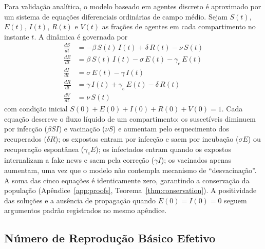 \documentclass[12pt,a4paper]{article}
\theoremstyle{definition}
\theoremstyle{plain}
\begin{document}
Para validação analítica, o modelo baseado em agentes discreto é aproximado por um sistema de equações diferenciais ordinárias de campo médio. Sejam $S(t)$, $E(t)$, $I(t)$, $R(t)$ e $V(t)$ as frações de agentes em cada compartimento no instante $t$. A dinâmica é governada por
\begin{align}
\frac{dS}{dt} &= -\beta\, S(t)\, I(t) + \delta\, R(t) - \nu\, S(t) \label{eq:dS}\\
\frac{dE}{dt} &= \beta\, S(t)\, I(t) - \sigma\, E(t) - \gamma_e\, E(t) \label{eq:dE}\\
\frac{dI}{dt} &= \sigma\, E(t) - \gamma\, I(t) \label{eq:dI}\\
\frac{dR}{dt} &= \gamma\, I(t) + \gamma_e\, E(t) - \delta\, R(t) \label{eq:dR}\\
\frac{dV}{dt} &= \nu\, S(t) \label{eq:dV}
\end{align}
com condição inicial $S(0) + E(0) + I(0) + R(0) + V(0) = 1$. Cada equação descreve o fluxo líquido de um compartimento: os suscetíveis diminuem por infecção ($\beta S I$) e vacinação ($\nu S$) e aumentam pelo esquecimento dos recuperados ($\delta R$); os expostos entram por infecção e saem por incubação ($\sigma E$) ou recuperação espontânea ($\gamma_e E$); os infectados entram quando os expostos internalizam a fake news e saem pela correção ($\gamma I$); os vacinados apenas aumentam, uma vez que o modelo não contempla mecanismo de ``desvacinação''. A soma das cinco equações é identicamente zero, garantindo a conservação da população (Apêndice~\ref{app:proofs}, Teorema~\ref{thm:conservation}). A positividade das soluções e a ausência de propagação quando $E(0) = I(0) = 0$ seguem argumentos padrão registrados no mesmo apêndice.

\subsection{Número de Reprodução Básico Efetivo}
\label{subsec:R0}
\end{document}
